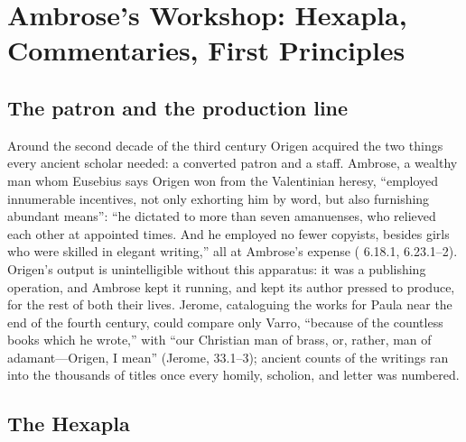 \section{Ambrose's Workshop: Hexapla, Commentaries, First Principles}

\subsection{The patron and the production line}

Around the second decade of the third century Origen acquired the two things
every ancient scholar needed: a converted patron and a staff. Ambrose, a
wealthy man whom Eusebius says Origen won from the Valentinian heresy,
``employed innumerable incentives, not only exhorting him by word, but also
furnishing abundant means'': ``he dictated to more than seven amanuenses, who
relieved each other at appointed times. And he employed no fewer copyists,
besides girls who were skilled in elegant writing,'' all at Ambrose's expense
( 6.18.1, 6.23.1--2). Origen's output is unintelligible
without this apparatus: it was a publishing operation, and Ambrose kept it
running, and kept its author pressed to produce, for the rest of both their
lives. Jerome, cataloguing the works for Paula near the end of the
fourth century, could compare only Varro, ``because of the countless books
which he wrote,'' with ``our Christian man of brass, or, rather, man of
adamant---Origen, I mean'' (Jerome,  33.1--3); ancient counts
of the writings ran into the thousands of titles once every homily, scholion,
and letter was numbered.

\subsection{The Hexapla}

